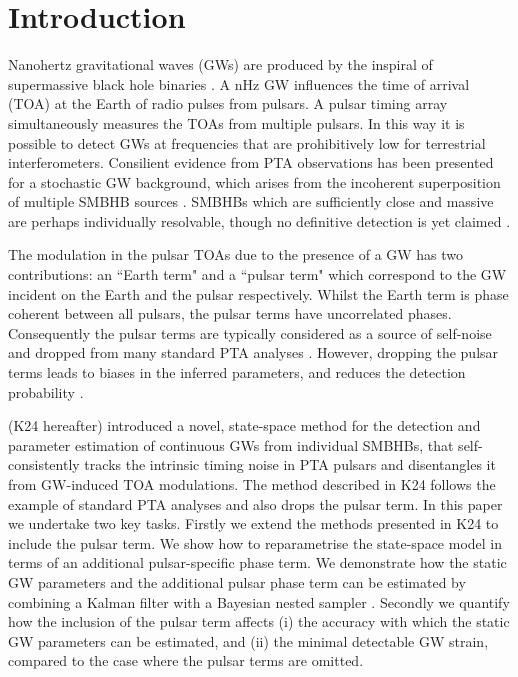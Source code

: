 \documentclass[fleqn,usenatbib,useAMS]{mnras}
\begin{document}
\section{Introduction}\label{sec:intro}
Nanohertz gravitational waves (GWs) are produced by the inspiral of supermassive black hole binaries \citep[SMBHBs;][]{Rajagopal1995,Jaffe_2003, Wyithe2003,Sesana2013,McWilliams_2014,Ravi2015MNRAS.447.2772R,Burke2019, Skyes2022}. A nHz GW influences the time of arrival (TOA) at the Earth of radio pulses from pulsars. A pulsar timing array \citep[PTA;][]{ Tiburzi2018, 2021hgwa.bookE...4V} simultaneously measures the TOAs from multiple pulsars. In this way it is possible to detect GWs at frequencies that are prohibitively low for terrestrial interferometers. Consilient evidence from PTA observations has been presented \citep{2023ApJ...951L...8A,2023arXiv230616214A,2023ApJ...951L...6R,2023RAA....23g5024X} for a stochastic GW background, which arises from the incoherent superposition of multiple SMBHB sources \citep{Allen1997,Sesana10,Christensen2019,Renzini2022}. SMBHBs which are sufficiently close and massive are perhaps individually resolvable, though no definitive detection is yet claimed \citep{Jenet2004,Zhu2014PPTA,Babak2016,Arzoumanian2023,2023arXiv230616226A}. \newline 

The modulation in the pulsar TOAs due to the presence of a GW has two contributions: an ``Earth term" and a ``pulsar term" which correspond to the GW incident on the Earth and the pulsar respectively. Whilst the Earth term is phase coherent between all pulsars, the pulsar terms have uncorrelated phases. Consequently the pulsar terms are typically considered as a source of self-noise and dropped from many standard PTA analyses \citep[e.g.][]{Sesana2010,Babak2012,Petiteau2013,Zhu2015,Taylors2016,Goldstein2018,Charisi2023arXiv230403786C}. However, dropping the pulsar terms leads to biases in the inferred parameters, and reduces the detection probability \citep{Zhupulsarterms,Chen2022,KimpsonPTA}. \newline 

\cite{KimpsonPTA} (K24 hereafter) introduced a novel, state-space method for the detection and parameter estimation of continuous GWs from individual SMBHBs, that self-consistently tracks the intrinsic timing noise in PTA pulsars \citep[e.g.][]{Shannon2010,Lasky2015,Caballero2016,Goncharov2021} and disentangles it from GW-induced TOA modulations. The method described in K24 follows the example of standard  PTA analyses and also drops the pulsar term. In this paper we undertake two key tasks. Firstly we extend the methods presented in K24 to include the pulsar term. We show how to reparametrise the state-space model in terms of an additional pulsar-specific phase term. We demonstrate how the static GW parameters and the additional pulsar phase term can be estimated by combining a Kalman filter \citep{Kalman1} with a Bayesian nested sampler \citep{Skilling, Ashton2022}. Secondly we quantify how the inclusion of the pulsar term affects (i) the accuracy with which the static GW parameters can be estimated, and (ii) the minimal detectable GW strain, compared to the case where the pulsar terms are omitted.  \newline 
\end{document}
